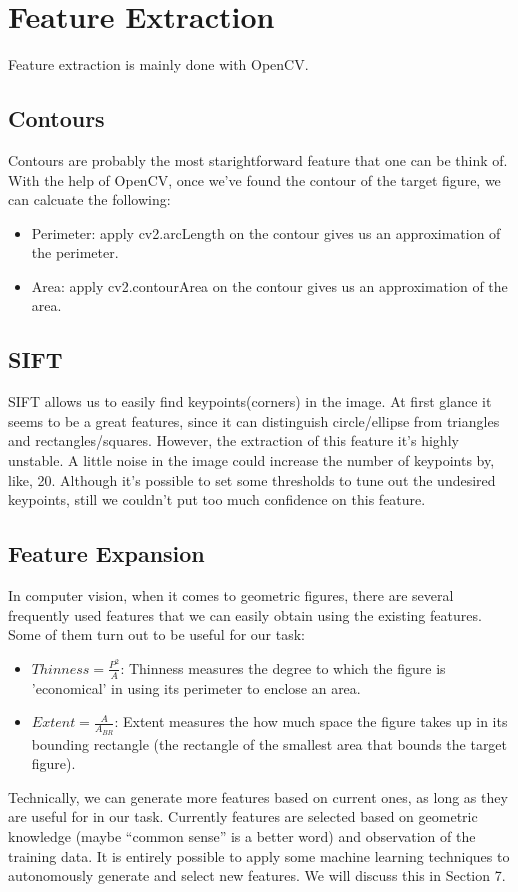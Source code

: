 \section{Feature Extraction}

Feature extraction is mainly done with OpenCV. 

\subsection{Contours}

Contours are probably the most starightforward feature that one can be think of. With the help of OpenCV, once we've found the contour of the target figure, we can calcuate the following:

\begin{itemize}
\item Perimeter: apply cv2.arcLength on the contour gives us an approximation of the perimeter.
\item Area: apply cv2.contourArea on the contour gives us an approximation of the area.
\end{itemize}

\subsection{SIFT}

SIFT allows us to easily find keypoints(corners) in the image. At first glance it seems to be a great features, since it can distinguish circle/ellipse from triangles and rectangles/squares. However, the extraction of this feature it's highly unstable. A little noise in the image could increase the number of keypoints by, like, 20. Although it's possible to set some thresholds to tune out the undesired keypoints, still we couldn't put too much confidence on this feature.

\subsection{Feature Expansion}

In computer vision, when it comes to geometric figures, there are several frequently used features that we can easily obtain using the existing features. Some of them turn out to be useful for our task:

\begin{itemize}
\item $Thinness = \frac{P^2}{A}$: Thinness measures the degree to which the figure is 'economical' in using its perimeter to enclose an area. 
\item $Extent = \frac{A}{A_{BR}}$: Extent measures the how much space the figure takes up in its bounding rectangle (the rectangle of the smallest area that bounds the target figure).
\end{itemize}

Technically, we can generate more features based on current ones, as long as they are useful for in our task. Currently features are selected based on geometric knowledge (maybe ``common sense'' is a better word) and observation of the training data. It is entirely possible to apply some machine learning techniques to autonomously generate and select new features. We will discuss this in Section 7.
